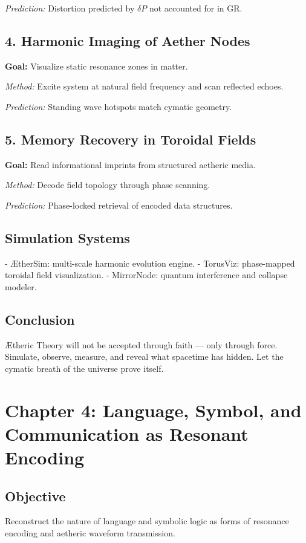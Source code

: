 \documentclass[12pt]{book}
\begin{document}
\textit{Prediction:} Distortion predicted by $\delta P$ not accounted for in GR.

\subsection*{4. Harmonic Imaging of Aether Nodes}
\textbf{Goal:} Visualize static resonance zones in matter.

\textit{Method:} Excite system at natural field frequency and scan reflected echoes.

\textit{Prediction:} Standing wave hotspots match cymatic geometry.

\subsection*{5. Memory Recovery in Toroidal Fields}
\textbf{Goal:} Read informational imprints from structured aetheric media.

\textit{Method:} Decode field topology through phase scanning.

\textit{Prediction:} Phase-locked retrieval of encoded data structures.

\subsection*{Simulation Systems}
- ÆtherSim: multi-scale harmonic evolution engine.
- TorusViz: phase-mapped toroidal field visualization.
- MirrorNode: quantum interference and collapse modeler.

\subsection*{Conclusion}
Ætheric Theory will not be accepted through faith — only through force. Simulate, observe, measure, and reveal what spacetime has hidden. Let the cymatic breath of the universe prove itself.







\section*{Chapter 4: Language, Symbol, and Communication as Resonant Encoding}

\subsection*{Objective}
Reconstruct the nature of language and symbolic logic as forms of resonance encoding and aetheric waveform transmission.
\end{document}
